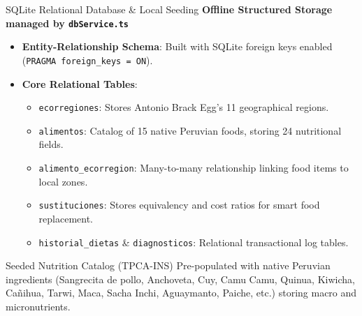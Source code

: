 \documentclass[aspectratio=169]{beamer}
\begin{document}
\begin{frame}{SQLite Relational Database \& Local Seeding}
    \textbf{Offline Structured Storage managed by \texttt{dbService.ts}}
    \begin{itemize}
        \item \textbf{Entity-Relationship Schema}: Built with SQLite foreign keys enabled (\texttt{PRAGMA foreign\_keys = ON}).
        \item \textbf{Core Relational Tables}:
        \begin{itemize}
            \item \texttt{ecorregiones}: Stores Antonio Brack Egg's 11 geographical regions.
            \item \texttt{alimentos}: Catalog of 15 native Peruvian foods, storing 24 nutritional fields.
            \item \texttt{alimento\_ecorregion}: Many-to-many relationship linking food items to local zones.
            \item \texttt{sustituciones}: Stores equivalency and cost ratios for smart food replacement.
            \item \texttt{historial\_dietas} \& \texttt{diagnosticos}: Relational transactional log tables.
        \end{itemize}
    \end{itemize}
    \begin{block}{Seeded Nutrition Catalog (TPCA-INS)}
        Pre-populated with native Peruvian ingredients (Sangrecita de pollo, Anchoveta, Cuy, Camu Camu, Quinua, Kiwicha, Cañihua, Tarwi, Maca, Sacha Inchi, Aguaymanto, Paiche, etc.) storing macro and micronutrients.
    \end{block}
\end{frame}
\end{document}
